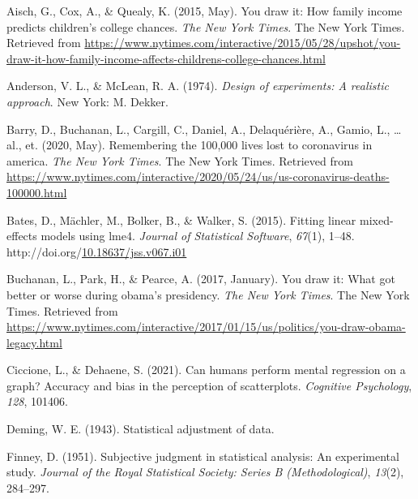 \documentclass[print]{nuthesis}
\newlength{\cslhangindent}
\newenvironment{CSLReferences}[2]%
{\setlength{\parindent}{0pt}%
\everypar{\setlength{\hangindent}{\cslhangindent}}\ignorespaces}%
{\par}
\begin{document}
\hypertarget{refs}{}
\begin{CSLReferences}{1}{0}
\leavevmode{}%
Aisch, G., Cox, A., \& Quealy, K. (2015, May). You draw it: How family income predicts children's college chances. \emph{The New York Times}. The New York Times. Retrieved from \url{https://www.nytimes.com/interactive/2015/05/28/upshot/you-draw-it-how-family-income-affects-childrens-college-chances.html}

\leavevmode{}%
Anderson, V. L., \& McLean, R. A. (1974). \emph{Design of experiments: A realistic approach}. New York: M. Dekker.

\leavevmode{}%
Barry, D., Buchanan, L., Cargill, C., Daniel, A., Delaquérière, A., Gamio, L., \ldots{} al., et. (2020, May). Remembering the 100,000 lives lost to coronavirus in america. \emph{The New York Times}. The New York Times. Retrieved from \url{https://www.nytimes.com/interactive/2020/05/24/us/us-coronavirus-deaths-100000.html}

\leavevmode{}%
Bates, D., Mächler, M., Bolker, B., \& Walker, S. (2015). Fitting linear mixed-effects models using {lme4}. \emph{Journal of Statistical Software}, \emph{67}(1), 1--48. http://doi.org/\href{https://doi.org/10.18637/jss.v067.i01}{10.18637/jss.v067.i01}

\leavevmode{}%
Buchanan, L., Park, H., \& Pearce, A. (2017, January). You draw it: What got better or worse during obama's presidency. \emph{The New York Times}. The New York Times. Retrieved from \url{https://www.nytimes.com/interactive/2017/01/15/us/politics/you-draw-obama-legacy.html}

\leavevmode{}%
Ciccione, L., \& Dehaene, S. (2021). Can humans perform mental regression on a graph? Accuracy and bias in the perception of scatterplots. \emph{Cognitive Psychology}, \emph{128}, 101406.

\leavevmode{}%
Deming, W. E. (1943). Statistical adjustment of data.

\leavevmode{}%
Finney, D. (1951). Subjective judgment in statistical analysis: An experimental study. \emph{Journal of the Royal Statistical Society: Series B (Methodological)}, \emph{13}(2), 284--297.


\end{CSLReferences}
\end{document}
